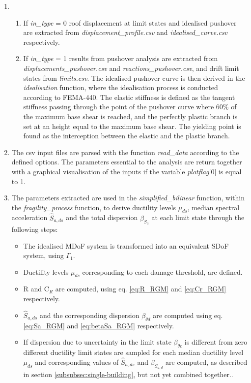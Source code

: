 \begin{enumerate}
\item
\begin{enumerate}
\item If \textit{in\_type} = 0 roof displacement at limit states and idealised pushover are extracted from \textit{displacement\_profile.csv} and \textit{idealised\_curve.csv} respectively.
\item If \textit{in\_type} = 1 results from pushover analysis are extracted from \textit{displacements\_pushover.csv} and \textit{reactions\_pushover.csv}, and drift limit states from \textit{limits.csv}. The idealised 	pushover curve is then derived in the \textit{idealisation} function, where the idealisation process is conducted according to FEMA-440. The elastic stiffness is defined as the 	tangent stiffness passing through the point of the pushover curve where 60\% of the maximum base shear is reached, and the perfectly plastic branch is set at an height equal to 	the maximum base shear. The yielding point is found as the interception between the elastic and the plastic branch.
\end{enumerate}

\item The csv input files are parsed with the function \textit{read\_data} according to the defined options. The parameters essential to the analysis are return together with a graphical visualisation of the inputs if the variable \textit{plotflag}[0] is equal to 1.

\item The parameters extracted are used in the \textit{simplified\_bilinear} function, within the \textit{fragility\_process} function, to derive ductility levels $\mu_{ds}$, median spectral acceleration $\hat{S}_{a,ds}$ and the total dispersion $\beta_{S_a}$ at each limit state through the following steps:
\begin{itemize}
\item The idealised MDoF system is transformed into an equivalent SDoF system, using $\Gamma_1$.
\item Ductility levels $\mu_{ds}$ corresponding to each damage threshold, are defined.
\item R and C$_R$ are computed, using eq. \ref{eq:R_RGM} and \ref{eq:Cr_RGM} respectively.
\item $\hat{S}_{a,ds}$ and the corresponding dispersion  $\beta_{\theta d}$ are computed using eq. \ref{eq:Sa_RGM} and \ref{eq:betaSa_RGM} respectively.
\item If dispersion due to uncertainty in the limit state $\beta_{\theta c}$ is different from zero different ductility limit states are sampled for each median ductility level $\mu_{ds}$ and corresponding values of $\hat{S}_{a,ds}$ and $\beta_{S_{a, d}}$ are computed, as described in section \ref{subsubsec:single-building}, but not yet combined together..
\end{itemize}


\end{enumerate}
